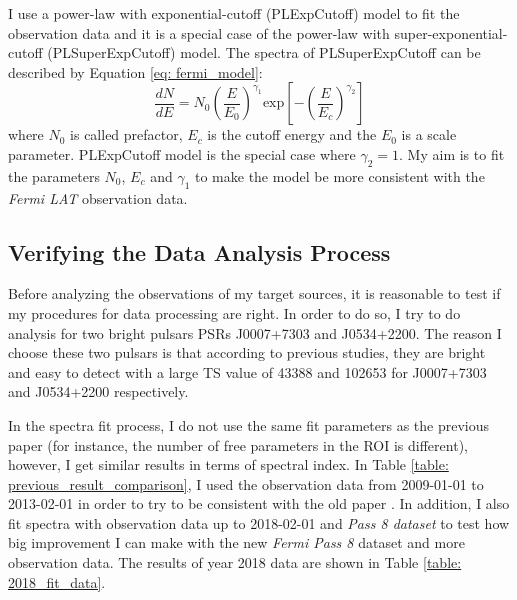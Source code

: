 \documentclass[12pt]{report}
\begin{document}
    I use a power-law with exponential-cutoff (PLExpCutoff) model to fit the 
    observation data and it is a special case of the power-law with 
    super-exponential-cutoff (PLSuperExpCutoff) model. The spectra of PLSuperExpCutoff 
    can be described by Equation \ref{eq: fermi_model}:  
    \begin{equation} 
      \label{eq: fermi_model}
      \frac{dN}{dE} = N_{0} \left(\frac{E}{E_0}\right)^{\gamma_1}\mbox{exp}\left[-\left(\frac{E}{E_c}\right)^{\gamma_2}\right]
    \end{equation}  
    where $N_0$ is called prefactor, $E_c$ is the cutoff energy and the $E_0$ is a scale 
    parameter. PLExpCutoff model is the special case where $\gamma_2=1$. My aim is to 
    fit the parameters $N_0$, $E_c$ and $\gamma_1$ to make the model be more 
    consistent with the \textit{Fermi LAT} observation data.

    \subsection{Verifying the Data Analysis Process}
      Before analyzing the observations of my target sources, it is reasonable to test 
      if my procedures for data processing are right. In order to do so, I try to do 
      analysis for two bright pulsars PSRs J0007+7303 and J0534+2200. The reason I choose 
      these two pulsars is that according to previous studies, they are bright and easy 
      to detect with a large TS value of 43388 and 102653 for J0007+7303 and J0534+2200 
      respectively. \citep{0067-0049-208-2-17}

      In the spectra fit process, I do not use the same fit parameters as the previous 
      paper (for instance, the number of free parameters in the ROI is different), 
      however, I get similar results in terms of spectral index.  
      In Table \ref{table: previous_result_comparison}, I used the observation data from 
      2009-01-01 to 2013-02-01 in order to try to be consistent with the old paper 
      \citep{0067-0049-208-2-17}. In addition, I also fit spectra with 
      observation data up to 2018-02-01 and \textit{Pass 8 dataset} to test how big improvement 
      I can make with the new \textit{Fermi Pass 8} dataset and more observation data. 
      The results of year 2018 data are shown in Table \ref{table: 2018_fit_data}.
\end{document}
